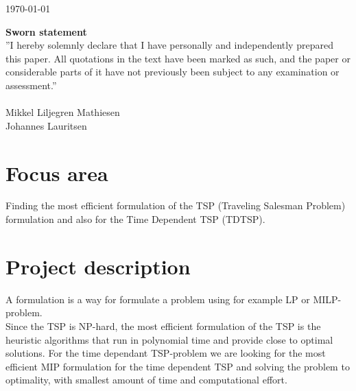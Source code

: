 \documentclass[a4paper,12pt]{article}
\begin{document}
\begin{titlepage}
		
		
		
		\vfill\vfill\vfill %
		
		{\large\today} %
		
		
		\vfill\vfill

		
		\vfill %
		
	\end{titlepage}
	\pagebreak


\textbf{Sworn statement}\\ 
”I hereby solemnly declare that I have personally and independently prepared this paper. All quotations in the text have been marked as such, and the paper or considerable parts of it have not previously been subject to any examination or assessment.” \\\\
Mikkel Liljegren Mathiesen\\
Johannes Lauritsen

\section*{Focus area}
Finding the most efficient formulation of the TSP (Traveling Salesman Problem) formulation and also for the Time Dependent TSP (TDTSP).

\section*{Project description}
A formulation is a way for formulate a problem using for example LP or MILP-problem.\\

Since the TSP is NP-hard, the most efficient formulation of the TSP is the heuristic algorithms that run in polynomial time and provide close to optimal solutions. For the time dependant TSP-problem we are looking for the most efficient MIP formulation for the time dependent TSP and solving the problem to optimality, with smallest amount of time and computational effort.\\
\end{document}

